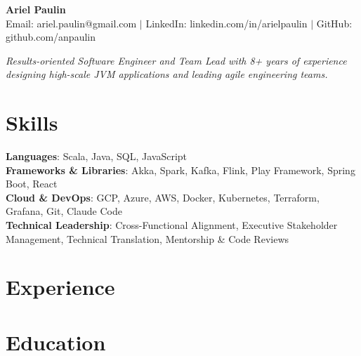 \documentclass[letterpaper,11pt]{article}
\newcommand{\resumeSubHeadingListStart}{\begin{itemize}[leftmargin=0.15in, label={}]}
\newcommand{\resumeSubHeadingListEnd}{\end{itemize}}
\begin{document}
\begin{center}
    \textbf{\Huge Ariel Paulin} \\ \vspace{4pt}
    \small{
    Email: ariel.paulin@gmail.com $|$ 
    LinkedIn: linkedin.com/in/arielpaulin $|$
    GitHub: github.com/anpaulin
    }
    \vspace{4pt}
\end{center}

\begin{center}
    \small\textit{Results-oriented Software Engineer and Team Lead with 8+ years of experience designing high-scale JVM applications and leading agile engineering teams.}
\end{center}

\section{Skills}
\begin{itemize}[leftmargin=0.15in, label={}]
  \small{\item{
    \textbf{Languages}: Scala, Java, SQL, JavaScript \\
    \textbf{Frameworks \& Libraries}: Akka, Spark, Kafka, Flink, Play Framework, Spring Boot, React \\
    \textbf{Cloud \& DevOps}: GCP, Azure, AWS, Docker, Kubernetes, Terraform, Grafana, Git, Claude Code \\
    \textbf{Technical Leadership}: Cross-Functional Alignment, Executive Stakeholder Management, Technical Translation, Mentorship \& Code Reviews
  }}
\end{itemize}

\section{Experience}
  \resumeSubHeadingListStart
    
    
    
    
    
    
    
    
    
    
  \resumeSubHeadingListEnd

\section{Education}
  \resumeSubHeadingListStart
    
  \resumeSubHeadingListEnd
\end{document}
